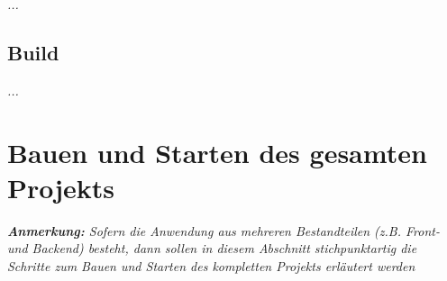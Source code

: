 \documentclass[a4paper,10pt]{scrartcl}
\begin{document}
\textit{...}

\subsection{Build}

\textit{...}

\newpage

\section{Bauen und Starten des gesamten Projekts}

\textit{\textbf{Anmerkung:} Sofern die Anwendung aus mehreren Bestandteilen (z.B. Front- und Backend) besteht, dann sollen in diesem Abschnitt stichpunktartig die Schritte zum Bauen und Starten des kompletten Projekts erläutert werden}
\end{document}
